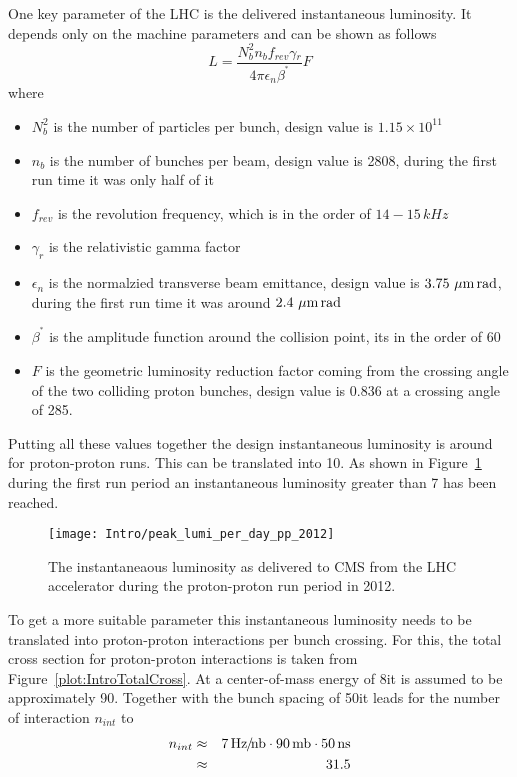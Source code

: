 One key parameter of the LHC is the delivered instantaneous luminosity. It depends only on the machine parameters and can be shown as follows
\begin{equation}
L = \frac{N_{b}^{2}n_{b}f_{rev}\gamma{}_{r}}{4\pi\epsilon{}_{n}\beta^{^\ast}}F
\label{eq:Luminosity}
\end{equation}
where
\begin{itemize}
\item{$N_{b}^{2}$} is the number of particles per bunch, design value is $1.15 \times 10^{11}$
\item{$n_{b}$} is the number of bunches per beam, design value is 2808, during the first run time it was only half of it
\item{$f_{rev}$} is the revolution frequency, which is in the order of $14-15\,kHz$
\item{$\gamma_{r}$} is the relativistic gamma factor
\item{$\epsilon{}_{n}$} is the normalzied transverse beam emittance, design value is $3.75\,\,\mu\text{m}{}\,\text{rad}$, during the first run time it was around $2.4\,\,\mu\text{m}{}\,\text{rad}$
\item{$\beta^{^\ast}$} is the amplitude function around the collision point, its in the order of 60\cm{}
\item{$F$} is the geometric luminosity reduction factor coming from the crossing angle of the two colliding proton bunches, design value is 0.836 at a crossing angle of 285\murad{}.
\end{itemize}

Putting all these values together the design instantaneous luminosity is around \LHigh{} for proton-proton runs. This can be translated into 10\hertzpernbarn{}. As shown in Figure~\ref{plot:IntroInstLumi} during the first run period an instantaneous luminosity greater than 7\hertzpernbarn{} has been reached.

\begin{figure}[!Hhtb]
  \centering
  \texttt{[image: Intro/peak\_lumi\_per\_day\_pp\_2012]}
  \caption[Instantaneous luminosity at CMS]{The instantaneaous luminosity as delivered to CMS from the LHC accelerator during the proton-proton run period in 2012. \label{plot:IntroInstLumi}}
\end{figure}

To get  a more suitable parameter this instantaneous luminosity needs to be translated into proton-proton interactions per bunch crossing. For this, the total cross section for proton-proton interactions is taken from Figure~\ref{plot:IntroTotalCross}. At a center-of-mass energy of 8\TeV it is assumed to be approximately 90\mb. Together with the bunch spacing of 50\ns it leads for the number of interaction $n_{int}$ to
\begin{eqnarray}
n_{int} & \approx & 7\, \text{Hz\hspace{-0.08em}/\hspace{-0.16em}}\text{nb} \cdot 90\,\text{mb} \cdot 50\,\text{ns} \nonumber \\
 & \approx & 31.5 \nonumber
\end{eqnarray}

